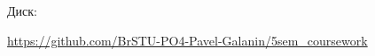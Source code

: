 \documentclass[12pt, a4paper, simple]{eskdtext}
\begin{document}
    
    
    Диск:
    
    \url{https://github.com/BrSTU-PO4-Pavel-Galanin/5sem_coursework}
    


\end{document}
